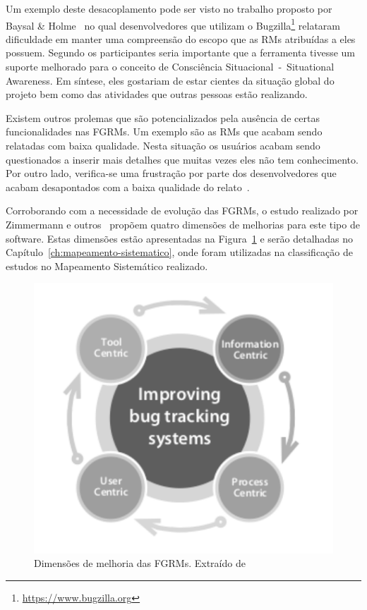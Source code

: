 Um exemplo deste desacoplamento pode ser visto no trabalho proposto por Baysal
\& Holme~\cite{baysal2012qualitative} no qual desenvolvedores que utilizam o
Bugzilla\footnote{\url{https://www.bugzilla.org}} relataram dificuldade em
manter uma compreensão do escopo que as RMs atribuídas a eles possuem. Segundo
os participantes seria importante que a ferramenta tivesse um suporte melhorado
para o conceito de Consciência Situacional~-~Situational Awareness. Em síntese,
eles gostariam de estar cientes da situação global do projeto bem como das
atividades que outras pessoas estão realizando.

Existem outros prolemas que são potencializados pela ausência de certas
funcionalidades nas FGRMs. Um exemplo são as RMs que acabam sendo relatadas com
baixa qualidade. Nesta situação os usuários acabam sendo questionados a inserir
mais detalhes que muitas vezes eles não tem conhecimento. Por outro lado,
verifica-se uma frustração por parte dos desenvolvedores que acabam desapontados
com a baixa qualidade do relato~\cite{just2008towards}.

Corroborando com a necessidade de evolução das FGRMs, o estudo realizado por
Zimmermann e outros~\cite{zimmermann2009improving} propõem quatro dimensões de
melhorias para este tipo de software. Estas dimensões estão apresentadas na
Figura~\ref{fig:dimensoes_melhorias_fgrm} e serão detalhadas no
Capítulo~\ref{ch:mapeamento-sistematico}, onde foram utilizadas na classificação
de estudos no Mapeamento Sistemático realizado.


\begin{figure}[htpb] \centering
	\includegraphics[width=0.6\linewidth]
	{chapter-intro/img/dimensoes_melhorias_fgrm.pdf}
	\caption{Dimensões de melhoria das FGRMs. Extraído de~\cite{zimmermann2005mining}}
\label{fig:dimensoes_melhorias_fgrm}
\end{figure}

